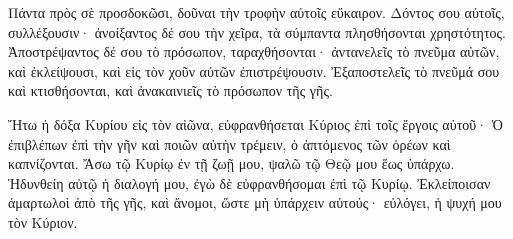 {Πάντα πρὸς σὲ προσδοκῶσι, δοῦναι τὴν τροφὴν αὐτοῖς εὔκαιρον.
Δόντος σου αὐτοῖς, συλλέξουσιν· ἀνοίξαντος δέ σου τὴν χεῖρα, τὰ σύμπαντα πλησθήσονται χρηστότητος.
Ἀποστρέψαντος δέ σου τὸ πρόσωπον, ταραχθήσονται· ἀντανελεῖς τὸ πνεῦμα αὐτῶν, καὶ ἐκλείψουσι, καὶ εἰς τὸν χοῦν αὐτῶν ἐπιστρέψουσιν.
Ἐξαποστελεῖς τὸ πνεῦμά σου καὶ κτισθήσονται, καὶ ἀνακαινιεῖς τὸ πρόσωπον τῆς γῆς.
\par }{\PP {}Ἤτω ἡ δόξα Κυρίου εἰς τὸν αἰῶνα, εὐφρανθήσεται Κύριος ἐπὶ τοῖς ἔργοις αὐτοῦ·
Ὁ ἐπιβλέπων ἐπὶ τὴν γῆν καὶ ποιῶν αὐτὴν τρέμειν, ὁ ἁπτόμενος τῶν ὀρέων καὶ καπνίζονται.
Ἄσω τῷ Κυρίῳ ἐν τῇ ζωῇ μου, ψαλῶ τῷ Θεῷ μου ἕως ὑπάρχω.
Ἡδυνθείη αὐτῷ ἡ διαλογή μου, ἐγὼ δὲ εὐφρανθήσομαι ἐπὶ τῷ Κυρίῳ.
Ἐκλείποισαν ἁμαρτωλοὶ ἀπὸ τῆς γῆς, καὶ ἄνομοι, ὥστε μὴ ὑπάρχειν αὐτούς· εὐλόγει, ἡ ψυχή μου τὸν Κύριον.

}
